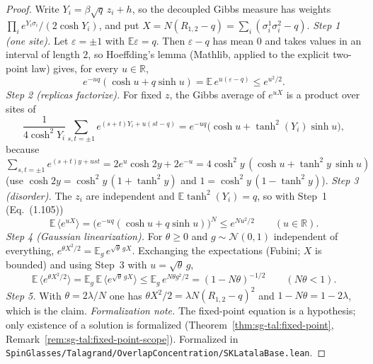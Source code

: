 \begin{proof}
\leanok
Write $Y_i=\beta\sqrt q\,z_i+h$, so the decoupled Gibbs measure has weights $\prod_i e^{Y_i\sigma_i}/(2\cosh Y_i)$, and put $X=N(R_{1,2}-q)=\sum_i(\sigma^1_i\sigma^2_i-q)$.
\emph{Step 1 (one site).} Let $\varepsilon=\pm1$ with $\mathbb{E}\varepsilon=q$. Then $\varepsilon-q$ has mean $0$ and takes values in an interval of length $2$, so Hoeffding's lemma (Mathlib, applied to the explicit two-point law) gives, for every $u\in\mathbb R$,
\[
e^{-uq}(\cosh u+q\sinh u)=\mathbb{E}\,e^{u(\varepsilon-q)}\le e^{u^2/2}.
\]
\emph{Step 2 (replicas factorize).} For fixed $z$, the Gibbs average of $e^{uX}$ is a product over sites of
\[
\frac1{4\cosh^2Y_i}\sum_{s,t=\pm1}e^{(s+t)Y_i+u(st-q)}=e^{-uq}\big(\cosh u+\tanh^2(Y_i)\sinh u\big),
\]
because $\sum_{s,t=\pm1}e^{(s+t)y+ust}=2e^u\cosh2y+2e^{-u}=4\cosh^2y\,(\cosh u+\tanh^2y\,\sinh u)$ (use $\cosh2y=\cosh^2y\,(1+\tanh^2y)$ and $1=\cosh^2y\,(1-\tanh^2y)$).
\emph{Step 3 (disorder).} The $z_i$ are independent and $\mathbb{E}\tanh^2(Y_i)=q$, so with Step~1 (Eq.~(1.105))
\[
\mathbb{E}\,\langle e^{uX}\rangle=\Big(e^{-uq}(\cosh u+q\sinh u)\Big)^N\le e^{Nu^2/2}\qquad(u\in\mathbb R).
\]
\emph{Step 4 (Gaussian linearization).} For $\theta\ge0$ and $g\sim\mathcal N(0,1)$ independent of everything, $e^{\theta X^2/2}=\mathbb{E}_g\,e^{\sqrt\theta\,gX}$. Exchanging the expectations (Fubini; $X$ is bounded) and using Step~3 with $u=\sqrt\theta\,g$,
\[
\mathbb{E}\,\langle e^{\theta X^2/2}\rangle=\mathbb{E}_g\,\mathbb{E}\,\langle e^{\sqrt\theta\,gX}\rangle\le\mathbb{E}_g\,e^{N\theta g^2/2}=(1-N\theta)^{-1/2}\qquad(N\theta<1).
\]
\emph{Step 5.} With $\theta=2\lambda/N$ one has $\theta X^2/2=\lambda N(R_{1,2}-q)^2$ and $1-N\theta=1-2\lambda$, which is the claim.
\emph{Formalization note.} The fixed-point equation is a hypothesis; only existence of a solution is formalized (Theorem~\ref{thm:sg-tal:fixed-point}, Remark~\ref{rem:sg-tal:fixed-point-scope}).
Formalized in \texttt{SpinGlasses/Talagrand/OverlapConcentration/SKLatalaBase.lean}.
\end{proof}

